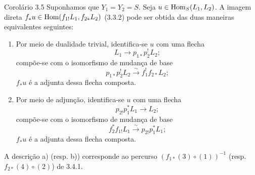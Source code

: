 \begin{statement}{Corolário 3.5}
Suponhamos que $Y_1=Y_2=S$. Seja $u\in\operatorname{Hom}_S(L_1,L_2)$. A imagem direta $f_*u\in\operatorname{Hom}(f_{1!}L_1,f_{2*}L_2)$ (3.3.2) pode ser obtida das duas maneiras equivalentes seguintes:
\end{statement}
\begin{enumerate}[label=\alph*)]
\item Por meio de dualidade trivial, identifica-se $u$ com uma flecha
\[
L_1\longrightarrow p_{1*}p_2^!L_2;
\]
compõe-se com o isomorfismo de mudança de base
\[
p_{1*}p_2^!L_2\xrightarrow{\sim}f_1^!f_{2*}L_2;
\]
$f_*u$ é a adjunta dessa flecha composta.
\item Por meio de adjunção, identifica-se $u$ com uma flecha
\[
p_{2!}p_1^*L_1\longrightarrow L_2;
\]
compõe-se com o isomorfismo de mudança de base
\[
f_2^*f_{1!}L_1\xrightarrow{\sim}p_{2!}p_1^*L_1;
\]
$f_*u$ é a adjunta dessa flecha composta.
\end{enumerate}
A descrição a) (resp. b)) corresponde ao percurso $(f_{1*}(3)\circ(1))^{-1}$ (resp. $f_{2*}(4)\circ(2)$) de 3.4.1.
